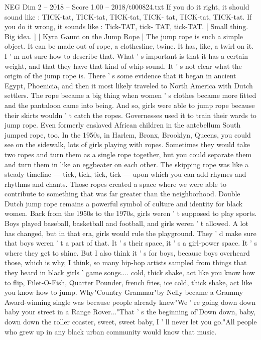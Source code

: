 \begin{textsample}{NEG Dim 2 – 2018 – Score 1.00 – 2018/t000824.txt}  \label{ex:f2_neg_046}
If you do it right, it should sound like : TICK-tat, TICK-tat, TICK-tat, TICK- tat, TICK-tat, TICK-tat.
If you do it wrong, it sounds like : Tick-TAT, tick- TAT, tick-TAT. [ Small thing.
Big idea. ] [ Kyra Gaunt on the Jump Rope ] The jump rope is such a simple object.
It can be made out of rope, a clothesline, twine.
It has, like, a twirl on it.
I ' m not sure how to describe that.
What ' s important is that it has a certain weight, and that they have that kind of whip sound.
It ' s not clear what the origin of the jump rope is.
There ' s some evidence that it began in ancient Egypt, Phoenicia, and then it most likely traveled to North America with Dutch settlers.
The rope became a big thing when women ' s clothes became more fitted and the pantaloon came into being.
And so, girls were able to jump rope because their skirts wouldn ' t catch the ropes.
Governesses used it to train their wards to jump rope.
Even formerly enslaved African children in the antebellum South jumped rope, too.
In the 1950s, in Harlem, Bronx, Brooklyn, Queens, you could see on the sidewalk, lots of girls playing with ropes.
Sometimes they would take two ropes and turn them as a single rope together, but you could separate them and turn them in like an eggbeater on each other.
The skipping rope was like a steady timeline — tick, tick, tick, tick — upon which you can add rhymes and rhythms and chants.
Those ropes created a space where we were able to contribute to something that was far greater than the neighborhood.
Double Dutch jump rope remains a powerful symbol of culture and identity for black women.
Back from the 1950s to the 1970s, girls weren ' t supposed to play sports.
Boys played baseball, basketball and football, and girls weren ' t allowed.
A lot has changed, but in that era, girls would rule the playground.
They ' d make sure that boys weren ' t a part of that.
It ' s their space, it ' s a girl-power space.
It ' s where they get to shine.
But I also think it ' s for boys, because boys overheard those, which is why, I think, so many hip-hop artists sampled from things that they heard in black girls ' game songs.... cold, thick shake, act like you know how to flip, Filet-O-Fish, Quarter Pounder, french fries, ice cold, thick shake, act like you know how to jump.
Why"Country Grammar"by Nelly became a Grammy Award-winning single was because people already knew"We ' re going down down baby your street in a Range Rover..."That ' s the beginning of"Down down, baby, down down the roller coaster, sweet, sweet baby, I ' ll never let you go."All people who grew up in any black urban community would know that music.

\end{textsample}
